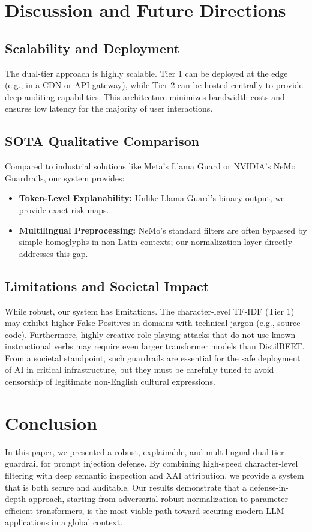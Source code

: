 \documentclass[10pt,conference]{IEEEtran}
\begin{document}
\section{Discussion and Future Directions}
\subsection{Scalability and Deployment}
The dual-tier approach is highly scalable. Tier 1 can be deployed at the edge (e.g., in a CDN or API gateway), while Tier 2 can be hosted centrally to provide deep auditing capabilities. This architecture minimizes bandwidth costs and ensures low latency for the majority of user interactions.

\subsection{SOTA Qualitative Comparison}
Compared to industrial solutions like Meta's Llama Guard or NVIDIA's NeMo Guardrails, our system provides:
\begin{itemize}
    \item \textbf{Token-Level Explanability:} Unlike Llama Guard's binary output, we provide exact risk maps.
    \item \textbf{Multilingual Preprocessing:} NeMo's standard filters are often bypassed by simple homoglyphs in non-Latin contexts; our normalization layer directly addresses this gap.
\end{itemize}

\subsection{Limitations and Societal Impact}
While robust, our system has limitations. The character-level TF-IDF (Tier 1) may exhibit higher False Positives in domains with technical jargon (e.g., source code). Furthermore, highly creative role-playing attacks that do not use known instructional verbs may require even larger transformer models than DistilBERT. From a societal standpoint, such guardrails are essential for the safe deployment of AI in critical infrastructure, but they must be carefully tuned to avoid censorship of legitimate non-English cultural expressions.

\section{Conclusion}
In this paper, we presented a robust, explainable, and multilingual dual-tier guardrail for prompt injection defense. By combining high-speed character-level filtering with deep semantic inspection and XAI attribution, we provide a system that is both secure and auditable. Our results demonstrate that a defense-in-depth approach, starting from adversarial-robust normalization to parameter-efficient transformers, is the most viable path toward securing modern LLM applications in a global context.



\end{document}
